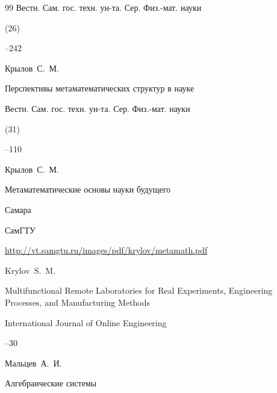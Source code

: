 \begin{thebibliography}{99}
\jour Вестн. Сам. гос. техн. ун-та. Сер. Физ.-мат. науки


(26)

--242






\by Крылов~С.~М.

\paper Перспективы метаматематических структур в науке

\jour Вестн. Сам. гос. техн. ун-та. Сер. Физ.-мат. науки


(31)

--110






\by Крылов~С.~М.

\book Метаматематические основы науки будущего

\publaddr Самара

\publ СамГТУ



\elink \url{http://vt.samgtu.ru/images/pdf/krylov/metamath.pdf}






\by Krylov~S.~M.

\paper Multifunctional Remote Laboratories for Real Experiments, Engineering Processes, and Manufacturing Methods

\jour International Journal of Online Engineering




--30





\by Мальцев~А.~И.

\book Алгебраические системы


\end{thebibliography}
